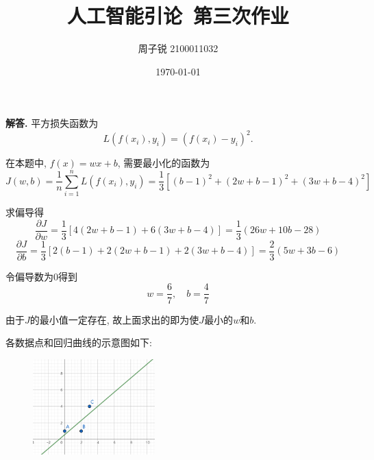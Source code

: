 \documentclass[11pt]{article}
\newenvironment{solution}{\par\noindent\textbf{解答. }}{\par}
\begin{document}
	
	\title{\textbf{人工智能引论\ 第三次作业}}
	\author{周子锐 2100011032}
	\date{\today}
	\maketitle

	\section{}

	\begin{solution}
		平方损失函数为 $$L(f(x_i), y_i) = (f(x_i)-y_i)^2.$$

		在本题中, $f(x)=wx+b$, 需要最小化的函数为 $$J(w,b)=\frac{1}{n}\sum_{i=1}^nL(f(x_i),y_i)=\frac{1}{3}\left[(b-1)^2+(2w+b-1)^2+(3w+b-4)^2\right]$$

		求偏导得 $$\frac{\partial J}{\partial w}=\frac{1}{3}[4(2w+b-1)+6(3w+b-4)]=\frac{1}{3}(26w+10b-28)$$ $$\frac{\partial J}{\partial b}=\frac{1}{3}[2(b-1)+2(2w+b-1)+2(3w+b-4)]=\frac{2}{3}(5w+3b-6)$$

		令偏导数为$0$得到 $$w=\frac{6}{7},\quad b=\frac{4}{7}$$

		由于$J$的最小值一定存在, 故上面求出的即为使$J$最小的$w$和$b$.

		各数据点和回归曲线的示意图如下:
		\begin{figure}[htbp]
			\centering
			\includegraphics[width=0.42\textwidth]{p1.png}
			\label{fig:hw4-1}
		\end{figure}
	\end{solution}
\end{document}

